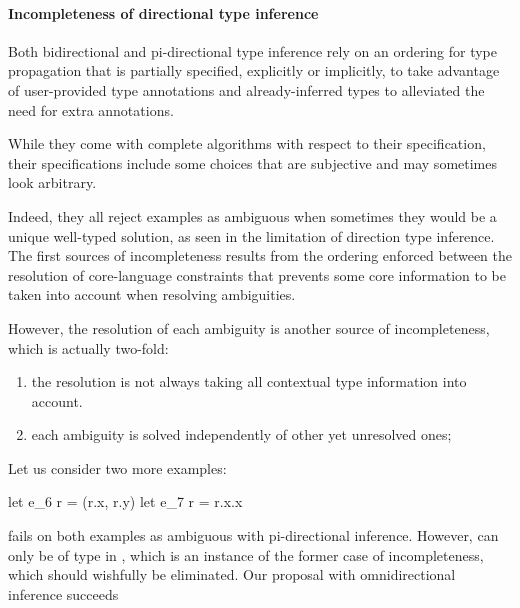 \documentclass[acmsmall,screen,nonacm]{acmart}
\begin{document}
\paragraph{Incompleteness of directional type inference}

Both bidirectional and pi-directional type inference rely on an ordering
for type propagation that is partially specified, explicitly or implicitly,
to take advantage of user-provided type annotations and already-inferred types
to alleviated the need for extra annotations.

While they come with complete algorithms with respect to their
specification, their specifications include some choices that are subjective
and may sometimes look arbitrary.

Indeed, they all reject examples as ambiguous when sometimes they would be a
unique well-typed solution, as seen in the limitation of direction type
inference.  The first sources of incompleteness results from the ordering
enforced between the resolution of core-language constraints that prevents
some core information to be taken into account when resolving ambiguities.

However, the resolution of each ambiguity is another source of
incompleteness, which is actually two-fold:
\begin{enumerate}
\item  
  the resolution is not always taking all contextual type information into
  account.  
\item
  each ambiguity is solved independently of other yet unresolved ones;
\end{enumerate}
Let us consider two more examples: 
\begin{program}[error]
let e_6 r = (r.x, r.y)
let e_7 r = r.x.x
\end{program}
\OCaml fails on both examples as ambiguous with pi-directional inference.
However,  can only be of type  in , which
is an instance of the former case of incompleteness, which should wishfully
be eliminated. Our proposal with omnidirectional inference succeeds

\end{document}
